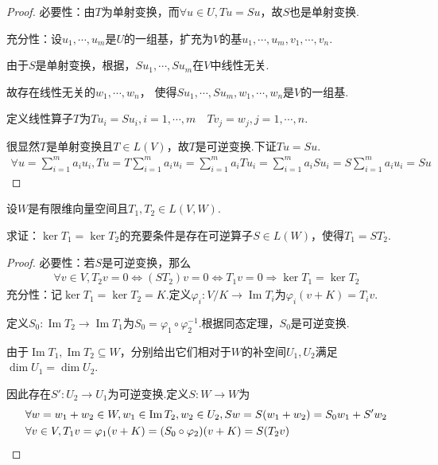 \begin{proof}
    必要性：由\(T\)为单射变换，而\(\forall u \in U,Tu=Su\)，故\(S\)也是单射变换.
    
    充分性：设\(u_1,\cdots,u_m\)是\(U\)的一组基，扩充为\(V\)的基\(u_1,\cdots,u_m,v_1,\cdots,v_n\).
    
    由于\(S\)是单射变换，根据，\(Su_1,\cdots,Su_m\)在\(V\)中线性无关.
    
    故存在线性无关的\(w_1,\cdots,w_n\)， 使得\(Su_1,\cdots,Su_m,w_1,\cdots,w_n\)是\(V\)的一组基.
    
    定义线性算子\(T\)为\(Tu_i=Su_i,i=1,\cdots,m \quad Tv_j=w_j,j=1,\cdots,n\).
    
    很显然\(T\)是单射变换且\(T \in L(V)\)，故\(T\)是可逆变换.下证\(Tu=Su\).
    \begin{align*}
        \forall u=\sum_{i=1}^m a_iu_i,Tu=T\sum_{i=1}^m a_iu_i
        =\sum_{i=1}^m a_iTu_i=\sum_{i=1}^m a_iSu_i=S\sum_{i=1}^m a_iu_i=Su 
    \end{align*}
\end{proof}

\newpage

\begin{problem}[4]\label{3.D.4}
    设\(W\)是有限维向量空间且\(T_1,T_2 \in L(V,W)\).

    求证：\(\ker T_1=\ker T_2\)的充要条件是存在可逆算子\(S \in L(W)\)，使得\(T_1=ST_2\).
\end{problem}

\begin{proof}
    必要性：若\(S\)是可逆变换，那么
    \begin{align*}
        \forall v \in V, T_2v=0 \Longleftrightarrow (ST_2)v=0 \Longleftrightarrow T_1v=0
        \Longrightarrow \ker T_1=\ker T_2
    \end{align*}
    充分性：记\(\ker T_1=\ker T_2=K\).定义\(\varphi_i:V/K \rightarrow \operatorname{Im} T_i\)为\(\varphi_i(v+K)=T_iv\).

    定义\(S_0:\operatorname{Im} T_2 \rightarrow \operatorname{Im} T_1\)为\(S_0=\varphi_1 \circ \varphi_2^{-1}\).根据同态定理，\(S_0\)是可逆变换.

    由于\(\operatorname{Im} T_1, \operatorname{Im} T_2 \subseteq W\)，分别给出它们相对于\(W\)的补空间\(U_1, U_2\)满足\(\dim U_1=\dim U_2\).

    因此存在\(S':U_2 \rightarrow U_1\)为可逆变换.定义\(S:W \rightarrow W\)为
    \begin{align*}
        &\forall w=w_1+w_2 \in W, w_1 \in \operatorname{Im} T_2, w_2 \in U_2, Sw=S(w_1+w_2)=S_0w_1+S'w_2 \\
        &\forall v \in V, T_1v=\varphi_1(v+K)=(S_0 \circ \varphi_2)(v+K)=S(T_2v) \qedhere
    \end{align*}
\end{proof}

